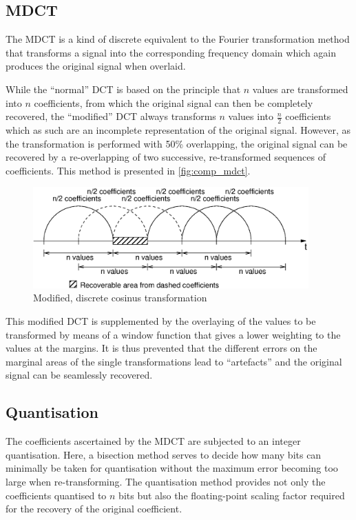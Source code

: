 \documentclass[a4paper,12pt,BCOR6mm,bibtotoc,idxtotoc]{scrbook}
\begin{document}
\subsection{MDCT}

The MDCT is a kind of discrete equivalent to the Fourier
transformation method that transforms a signal into the corresponding
frequency domain which again produces the original signal when overlaid.

While the ``normal'' DCT is based on the principle that $n$ values are
transformed into $n$ coefficients, from which the original signal can then be
completely recovered, the ``modified'' DCT always transforms $n$ values into
$\frac{n}{2}$ coefficients which as such are an incomplete representation of
the original signal. However, as the transformation is performed with 50\%
overlapping, the original signal can be recovered by a re-overlapping of two
successive, re-transformed sequences of coefficients. This method is presented
in \autoref{fig:comp_mdct}.

\begin{figure}[htb] \begin{center} \includegraphics[width=300pt]{bilder/mdct_en} \end{center} \caption{Modified, discrete cosinus transformation} \label{fig:comp_mdct} \end{figure}

This modified DCT is supplemented by the overlaying of the values to be transformed by means of a window function that gives a lower weighting to the values at the margins. It is thus prevented that the different errors on the marginal areas of the single transformations lead to ``artefacts'' and the original signal can be seamlessly recovered.

\subsection{Quantisation}

The coefficients ascertained by the MDCT are subjected to an integer quantisation. Here, a bisection method serves to decide how many bits can minimally be taken for quantisation without the maximum error becoming too large when re-transforming. The quantisation method provides not only the coefficients quantised to $n$ bits but also the floating-point scaling factor required for the recovery of the original coefficient.
\end{document}
